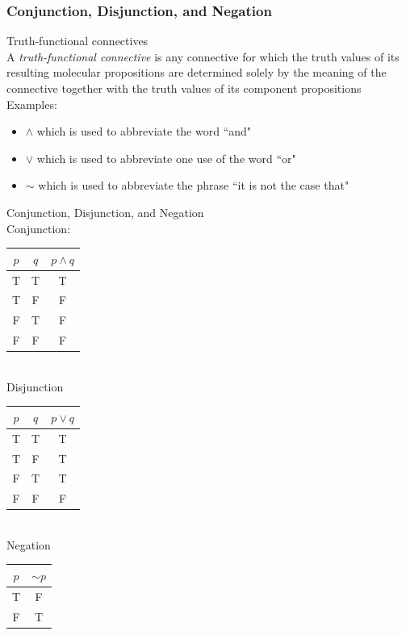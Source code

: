 \documentclass[11pt, fleqn]{article}
\begin{document}
\subsubsection{Conjunction, Disjunction, and Negation}
Truth-functional connectives\\
A \textit{truth-functional connective} is any connective for which the truth values of its resulting molecular propositions are determined solely by the meaning of the connective together with the truth values of its component propositions\\
Examples:
\begin{itemize}
    \item $\wedge$ which is used to abbreviate the word ``and"
    \item $\vee$ which is used to abbreviate one use of the word ``or"
    \item $\sim$ which is used to abbreviate the phrase ``it is not the case that"
\end{itemize}

Conjunction, Disjunction, and Negation\\

Conjunction:\\
\begin{tabular}{c|c|c}
    $p$ & $q$ & $p\wedge q$\\
    \hline
    T & T & T\\
    T & F & F\\
    F & T & F\\
    F & F & F
\end{tabular}\\

Disjunction\\
\begin{tabular}{c|c|c}
    $p$ & $q$ & $p\vee q$\\
    \hline
    T & T & T\\
    T & F & T\\
    F & T & T\\
    F & F & F
\end{tabular}\\

Negation\\
\begin{tabular}{c|c}
    $p$ & $\sim p$\\
    \hline
    T & F\\
    F & T
\end{tabular}\\
\end{document}
